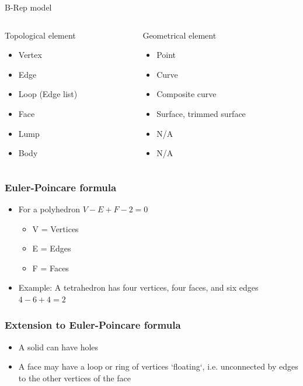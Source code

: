 \begin{frame}[fragile]{B-Rep model}
 \begin{columns}
  \begin{column}{0.55\linewidth}
	Topological element
	\begin{itemize}
	\item Vertex
	\item Edge
	\item Loop (Edge list)
	\item Face
	\item Lump
	\item Body
	\end{itemize}
	
  \end{column}%
  \begin{column}{0.45\linewidth}
	Geometrical element

	\begin{itemize}
	\item Point
	\item Curve
	\item Composite curve
	\item Surface, trimmed surface
	\item N/A
	\item N/A
	\end{itemize}
  \end{column}
 \end{columns}
\end{frame}

\begin{frame}[fragile]\frametitle{Euler-Poincare formula}
\begin{itemize}
\item For a polyhedron $ V - E + F - 2 = 0$               
\begin{itemize}
\item V = Vertices
\item E = Edges
\item F = Faces
\end{itemize}
\item Example: A tetrahedron has four vertices, four faces, and six edges
$4-6+4=2$
\end{itemize}
\end{frame}

\begin{frame}[fragile]\frametitle{Extension to Euler-Poincare formula}
\begin{itemize}
\item A solid can have holes 
\item A face may have a loop or ring of vertices `floating‘, i.e. unconnected by edges to the other vertices of the face 
\end{itemize}
\end{frame}



